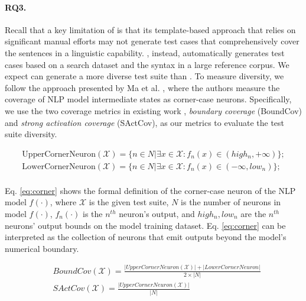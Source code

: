 \paragraph{RQ3.}
Recall that a key limitation of \Cklst is that its template-based
approach that relies on significant manual efforts may not generate
test cases that comprehensively cover the sentences in a linguistic
capability. \tool, instead, automatically generates test cases based
on a search dataset and the syntax in a large reference corpus. We
expect \tool can generate a more diverse test suite than \Cklst. To
measure diversity, we follow the approach presented by Ma et
al. \cite{ma2018deepgauge}, where the authors measure the coverage of
NLP model intermediate states as corner-case neurons.    Specifically, we use the  two
coverage metrics in existing work \cite{ma2018deepgauge},
\textit{boundary coverage} (BoundCov) and \textit{strong activation
  coverage} (SActCov), as our metrics to evaluate the test suite
diversity.

\begin{equation}
\begin{split}
    \text{UpperCornerNeuron}(\mathcal{X}) = \{n \in N | \exists x \in \mathcal{X}: f_n(x) \in (high_n, +\infty)\}; \\
    \text{LowerCornerNeuron}(\mathcal{X}) = \{n \in N | \exists x \in \mathcal{X}: f_n(x) \in (-\infty, low_n)\}; \\
\end{split}
    \label{eq:corner}
\end{equation}

\noindent Eq. \ref{eq:corner} shows the formal definition of the corner-case neuron of the NLP model $f(\cdot)$, where $\mathcal{X}$ is the given test suite, $N$ is the number of neurons in model $f(\cdot)$, $f_n(\cdot)$ is the $n^{th}$ neuron's output, and $high_n, low_n$ are the $n^{th}$ neurons' output bounds on the model training dataset.
Eq. \ref{eq:corner} can be interpreted as the collection of neurons that emit outputs beyond the model's numerical boundary.

\begin{equation}
\begin{split}
     & BoundCov(\mathcal{X}) = \frac{|UpperCornerNeuron(\mathcal{X})| + |LowerCornerNeuron| }{2 \times |N|} \\ 
     & SActCov(\mathcal{X}) = \frac{|UpperCornerNeuron(\mathcal{X})|} {|N|} \\ 
\end{split}
    \label{eq:coverage}
\end{equation}

